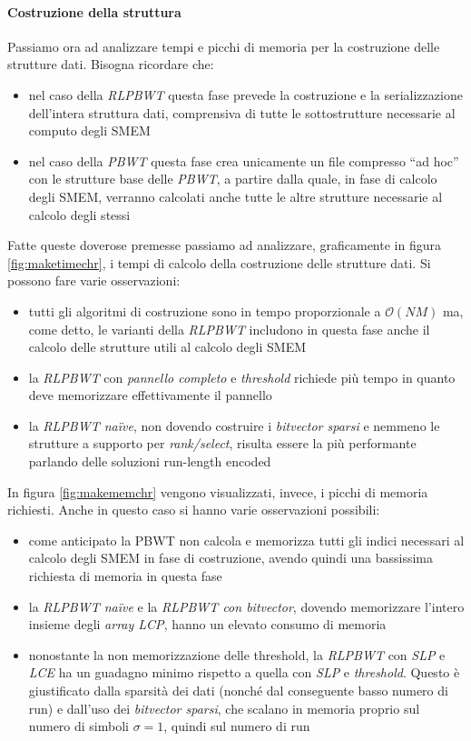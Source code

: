 \paragraph{Costruzione della struttura}
Passiamo ora ad analizzare tempi e picchi di memoria per la costruzione delle
strutture dati. Bisogna ricordare che:
\begin{itemize}
  \item nel caso della \textit{RLPBWT} questa fase prevede la costruzione e la
  serializzazione dell'intera struttura dati, comprensiva di tutte le
  sottostrutture necessarie al computo degli SMEM
  \item nel caso della \textit{PBWT} questa fase crea unicamente un file
  compresso ``ad hoc'' con le strutture base delle \textit{PBWT}, a partire
  dalla quale, in fase di calcolo degli SMEM, verranno calcolati anche tutte le
  altre strutture necessarie al calcolo degli stessi
\end{itemize}
Fatte queste doverose premesse passiamo ad analizzare, graficamente in figura
\ref{fig:maketimechr}, i tempi di calcolo della costruzione delle strutture
dati. Si possono fare varie osservazioni:
\begin{itemize}
  \item tutti gli algoritmi di costruzione sono in tempo proporzionale a
  $\mathcal{O}(NM)$ ma, come detto, le varianti della \textit{RLPBWT} includono
  in questa fase anche il calcolo delle strutture utili al calcolo degli SMEM
  \item la \textit{RLPBWT} con \textit{pannello completo} e \textit{threshold}
  richiede più tempo in quanto deve memorizzare effettivamente il pannello
  \item la \textit{RLPBWT na\"{i}ve}, non dovendo costruire i \textit{bitvector
    sparsi} e nemmeno le strutture a supporto per \textit{rank/select}, risulta
  essere la più performante parlando delle soluzioni run-length encoded
\end{itemize}
In figura \ref{fig:makememchr} vengono visualizzati, invece, i picchi di memoria
richiesti. Anche in questo caso si hanno varie osservazioni possibili:
\begin{itemize}
  \item come anticipato la PBWT non calcola e memorizza tutti gli indici
  necessari al calcolo degli SMEM in fase di costruzione, avendo quindi una
  bassissima richiesta di memoria in questa fase
  \item la \textit{RLPBWT na\"{i}ve} e la \textit{RLPBWT con bitvector}, dovendo
  memorizzare l'intero insieme degli \textit{array LCP}, hanno un elevato
  consumo di memoria
  \item nonostante la non memorizzazione delle threshold, la \textit{RLPBWT} con
  \textit{SLP} e \textit{LCE} ha un guadagno minimo rispetto a quella con
  \textit{SLP} e \textit{threshold}. Questo è giustificato dalla sparsità dei
  dati (nonché dal conseguente basso numero di run) e dall'uso dei
  \textit{bitvector sparsi}, che scalano in memoria proprio sul numero di
  simboli $\sigma=1$, quindi sul numero di run
\end{itemize}
